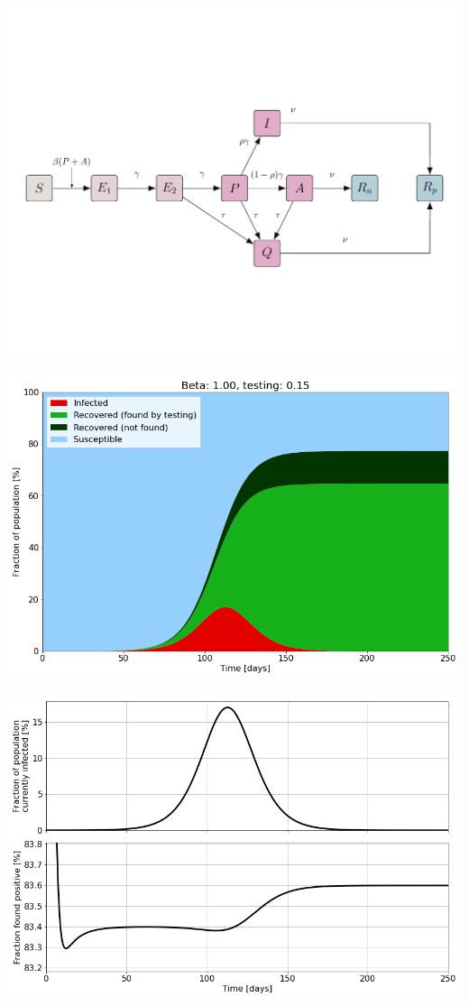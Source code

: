 \documentclass[10pt,a4paper,landscape]{article}
\begin{document}
\centering
\includegraphics[width=0.9\linewidth]{../Descriptions/TestIntensityFigure.pdf}

\includegraphics[width=0.98\linewidth]{TestIntensity_ExampleStacked.png}

\includegraphics[width=0.98\linewidth]{TestIntensity_ExampleTestRatio.png}
\end{document}
